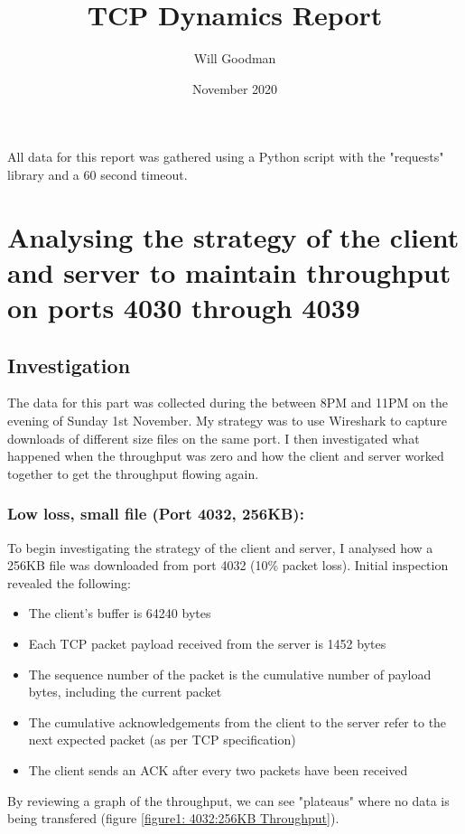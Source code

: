 \documentclass[12pt]{article}
\title{TCP Dynamics Report}
\date{November 2020}
\author{Will Goodman}
\begin{document}
\maketitle

All data for this report was gathered using a Python script with the "requests" library and a 60 second timeout.

\section{Analysing the strategy of the client and server to maintain throughput on ports 4030 through 4039}
\subsection*{Investigation}
The data for this part was collected during the between 8PM and 11PM on the evening of Sunday 1st November.
My strategy was to use Wireshark to capture downloads of different size files on the same port.
I then investigated what happened when the throughput was zero and how the client and server worked together to get the throughput flowing again.

\subsubsection*{Low loss, small file (Port 4032, 256KB):}
To begin investigating the strategy of the client and server, I analysed how a 256KB file was downloaded from port 4032 (10\% packet loss).
Initial inspection revealed the following:
\begin{itemize}
  \item The client's buffer is 64240 bytes
  \item Each TCP packet payload received from the server is 1452 bytes
  \item The sequence number of the packet is the cumulative number of payload bytes, including the current packet
  \item The cumulative acknowledgements from the client to the server refer to the next expected packet (as per TCP specification)
  \item The client sends an ACK after every two packets have been received
\end{itemize}

By reviewing a graph of the throughput, we can see "plateaus" where no data is being transfered (figure \ref{figure1: 4032:256KB Throughput}).
\end{document}
